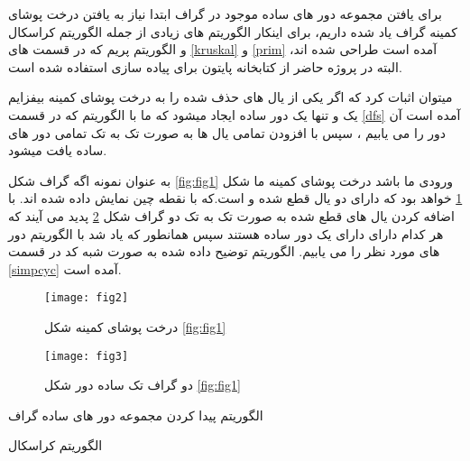 برای یافتن مجموعه دور های ساده موجود در گراف ابتدا نیاز به یافتن درخت پوشای کمینه
گراف یاد شده داریم، برای اینکار الگوریتم های زیادی از جمله الگوریتم کراسکال
و الگوریتم پریم
که در قسمت های
\ref{kruskal}
و
\ref{prim}
آمده است
طراحی شده اند، البته در پروژه حاضر از کتابخانه
پایتون برای پیاده سازی استفاده شده است.

میتوان اثبات کرد که اگر یکی از یال های حذف شده را به درخت پوشای کمینه بیفزایم 
یک و تنها یک دور ساده ایجاد میشود که ما با الگوریتم
که در قسمت
\ref{dfs}
آمده است
آن دور را می یابیم
، سپس با افزودن تمامی یال ها به صورت تک به تک تمامی دور های ساده یافت میشود.

به عنوان نمونه اگه گراف شکل
\ref{fig:fig1}
ورودی ما باشد درخت پوشای کمینه ما شکل
\ref{fig:fig2}
خواهد بود که دارای دو یال قطع شده
و
است.که با نقطه چین نمایش داده شده اند.
با اضافه کردن یال های قطع شده به صورت تک به تک دو گراف شکل
\ref{fig:fig3}
پدید می آیند که هر کدام دارای دارای یک دور ساده هستند سپس همانطور که یاد شد
با الگوریتم
دور های مورد نظر را می یابیم.
الگوریتم توضیح داده شده به صورت شبه کد در قسمت
\ref{simpcyc}
آمده است.
\cite{Dorfler18}
\begin{figure}[ht]
	\centerline{\texttt{[image: fig2]}}
	\caption{درخت پوشای کمینه شکل
	\ref{fig:fig1} }
	\label{fig:fig2}
\end{figure}

\begin{figure}[ht]
	\centerline{\texttt{[image: fig3]}}
	\caption{دو گراف تک ساده دور شکل
		\ref{fig:fig1} }
	\label{fig:fig3}
\end{figure}
\begin{algorithm}[ht]
	\onehalfspacing
	\caption{الگوریتم پیدا کردن مجموعه دور های ساده گراف} 
	\label{simpcyc}
	\begin{algorithmic}[1]
		\REQUIRE
		\ENSURE
		\STATE 
		\STATE 
		\STATE 
		\STATE
		\STATE
		\STATE
		\STATE
		\STATE
	\end{algorithmic}
\end{algorithm}

\begin{algorithm}[ht]
	\onehalfspacing
	\caption{الگوریتم کراسکال} 
	\label{kruskal}
	\begin{algorithmic}[1]
		\REQUIRE
		\ENSURE
		\STATE
	    \STATE
	    \STATE
	    \STATE
		\STATE
	    \STATE
	    \STATE
	    \STATE
	\end{algorithmic}
\end{algorithm}

